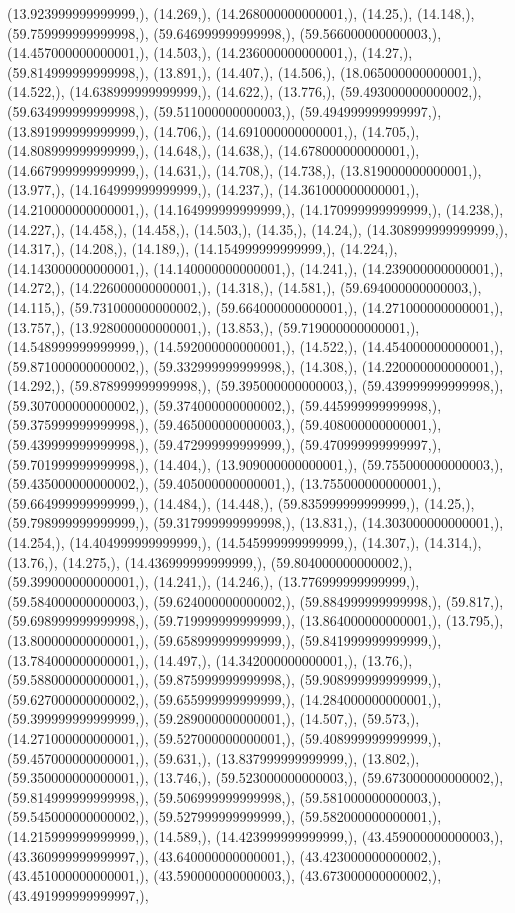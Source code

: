 \documentclass{article}
\begin{document}
(13.923999999999999,), (14.269,), (14.268000000000001,), (14.25,), (14.148,), (59.759999999999998,), (59.646999999999998,), (59.566000000000003,), (14.457000000000001,), (14.503,), (14.236000000000001,), (14.27,), (59.814999999999998,), (13.891,), (14.407,), (14.506,), (18.065000000000001,), (14.522,), (14.638999999999999,), (14.622,), (13.776,), (59.493000000000002,), (59.634999999999998,), (59.511000000000003,), (59.494999999999997,), (13.891999999999999,), (14.706,), (14.691000000000001,), (14.705,), (14.808999999999999,), (14.648,), (14.638,), (14.678000000000001,), (14.667999999999999,), (14.631,), (14.708,), (14.738,), (13.819000000000001,), (13.977,), (14.164999999999999,), (14.237,), (14.361000000000001,), (14.210000000000001,), (14.164999999999999,), (14.170999999999999,), (14.238,), (14.227,), (14.458,), (14.458,), (14.503,), (14.35,), (14.24,), (14.308999999999999,), (14.317,), (14.208,), (14.189,), (14.154999999999999,), (14.224,), (14.143000000000001,), (14.140000000000001,), (14.241,), (14.239000000000001,), (14.272,), (14.226000000000001,), (14.318,), (14.581,), (59.694000000000003,), (14.115,), (59.731000000000002,), (59.664000000000001,), (14.271000000000001,), (13.757,), (13.928000000000001,), (13.853,), (59.719000000000001,), (14.548999999999999,), (14.592000000000001,), (14.522,), (14.454000000000001,), (59.871000000000002,), (59.332999999999998,), (14.308,), (14.220000000000001,), (14.292,), (59.878999999999998,), (59.395000000000003,), (59.439999999999998,), (59.307000000000002,), (59.374000000000002,), (59.445999999999998,), (59.375999999999998,), (59.465000000000003,), (59.408000000000001,), (59.439999999999998,), (59.472999999999999,), (59.470999999999997,), (59.701999999999998,), (14.404,), (13.909000000000001,), (59.755000000000003,), (59.435000000000002,), (59.405000000000001,), (13.755000000000001,), (59.664999999999999,), (14.484,), (14.448,), (59.835999999999999,), (14.25,), (59.798999999999999,), (59.317999999999998,), (13.831,), (14.303000000000001,), (14.254,), (14.404999999999999,), (14.545999999999999,), (14.307,), (14.314,), (13.76,), (14.275,), (14.436999999999999,), (59.804000000000002,), (59.399000000000001,), (14.241,), (14.246,), (13.776999999999999,), (59.584000000000003,), (59.624000000000002,), (59.884999999999998,), (59.817,), (59.698999999999998,), (59.719999999999999,), (13.864000000000001,), (13.795,), (13.800000000000001,), (59.658999999999999,), (59.841999999999999,), (13.784000000000001,), (14.497,), (14.342000000000001,), (13.76,), (59.588000000000001,), (59.875999999999998,), (59.908999999999999,), (59.627000000000002,), (59.655999999999999,), (14.284000000000001,), (59.399999999999999,), (59.289000000000001,), (14.507,), (59.573,), (14.271000000000001,), (59.527000000000001,), (59.408999999999999,), (59.457000000000001,), (59.631,), (13.837999999999999,), (13.802,), (59.350000000000001,), (13.746,), (59.523000000000003,), (59.673000000000002,), (59.814999999999998,), (59.506999999999998,), (59.581000000000003,), (59.545000000000002,), (59.527999999999999,), (59.582000000000001,), (14.215999999999999,), (14.589,), (14.423999999999999,), (43.459000000000003,), (43.360999999999997,), (43.640000000000001,), (43.423000000000002,), (43.451000000000001,), (43.590000000000003,), (43.673000000000002,), (43.491999999999997,), 
\end{document}
